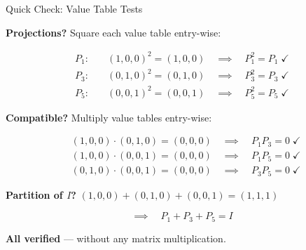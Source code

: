 \documentclass[10pt]{beamer}
\theoremstyle{definition}
\newcommand{\x}[1]{\alert{\textbf{#1}}}
\begin{document}
%
\begin{frame}[shrink=5]{Quick Check: Value Table Tests}

\x{Projections?} \; Square each value table entry-wise:

\begin{align*}
P_1: \quad &(1,0,0)^2 = (1,0,0) \quad\implies\quad P_1^2 = P_1 \;\checkmark \\[3pt]
P_3: \quad &(0,1,0)^2 = (0,1,0) \quad\implies\quad P_3^2 = P_3 \;\checkmark \\[3pt]
P_5: \quad &(0,0,1)^2 = (0,0,1) \quad\implies\quad P_5^2 = P_5 \;\checkmark
\end{align*}

\vfill

\x{Compatible?} \; Multiply value tables entry-wise:

\begin{align*}
&(1,0,0)\!\cdot\!(0,1,0) = (0,0,0) \quad\implies\quad P_1 P_3 = 0 \;\checkmark \\[3pt]
&(1,0,0)\!\cdot\!(0,0,1) = (0,0,0) \quad\implies\quad P_1 P_5 = 0 \;\checkmark \\[3pt]
&(0,1,0)\!\cdot\!(0,0,1) = (0,0,0) \quad\implies\quad P_3 P_5 = 0 \;\checkmark
\end{align*}

\vfill

\x{Partition of $I$?} \; $(1,0,0)+(0,1,0)+(0,0,1) = (1,1,1)$

$$\implies\quad P_1 + P_3 + P_5 = I$$

\vfill\pause

\x{All verified} --- without any matrix multiplication.

\end{frame}
\end{document}
